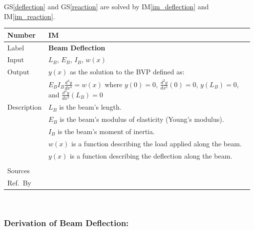 \documentclass[12pt]{article}
\newcommand{\colAwidth}{0.13\textwidth}
\newcommand{\colBwidth}{0.82\textwidth}
\newcommand{\gsref}[1]{GS\ref{#1}}
\newcounter{instnum} %
\newcommand{\iref}[1]{IM\ref{#1}}
\begin{document}
\gsref{deflection} and \gsref{reaction} are solved by \iref{im_deflection} and \iref{im_reaction}.


\noindent
\begin{minipage}{\textwidth}
    \renewcommand*{\arraystretch}{1.5}
    \begin{tabular}{| p{\colAwidth} | p{\colBwidth}|}
        \hline
        \rowcolor[gray]{0.9}
        Number      & IM{instnum}\theinstnum{}\label{im_deflection}     \\
        \hline
        Label       & \bf Beam Deflection                                              \\
        \hline
        Input       & $L_B$, $E_B$, $I_B$, $w(x)$                                      \\
        \hline
        Output      & \(y(x)\) as the solution to the BVP defined as:                  \\
                    & \(E_{B}I_{B}\frac{d^{4}y}{dx^{4}}=w(x)\) where \(y(0)=0\),
        \(\frac{d^{2}y}{dx^{2}}(0)=0\), \(y(L_B)=0\), and
        \(\frac{d^{2}y}{dx^{2}}(L_B)=0\)                                               \\
        \hline
        Description & $L_B$ is the beam's length.                                      \\
                    & $E_B$ is the beam's modulus of elasticity (Young's modulus).     \\
                    & $I_B$ is the beam's moment of inertia.                           \\
                    & $w(x)$ is a function describing the load applied along the beam. \\
                    & $y(x)$ is a function describing the deflection along the beam.   \\
        \\
        \hline
        Sources     & \nc{}                                                            \\
        \hline
        Ref.\ By    &                                                                  \\
        \hline
    \end{tabular}
\end{minipage}\\

\subsubsection*{Derivation of Beam Deflection:}
\end{document}
